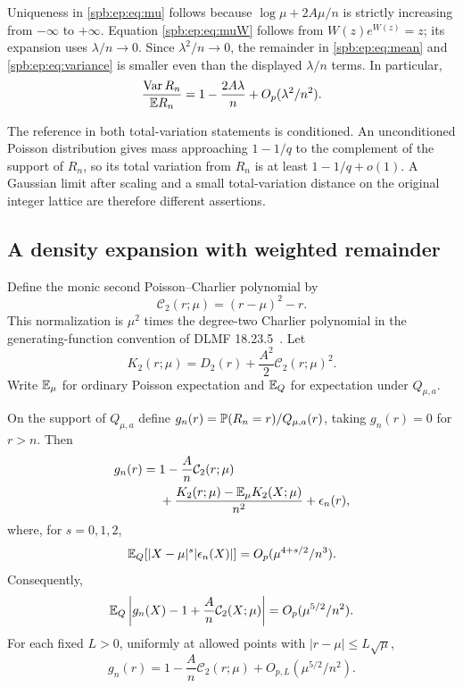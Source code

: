 Uniqueness in \eqref{spb:ep:eq:mu} follows because
$\log\mu+2A\mu/n$ is strictly increasing from $-\infty$ to $+\infty$.
Equation \eqref{spb:ep:eq:muW} follows from $W(z)e^{W(z)}=z$;
its expansion uses $\lambda/n\to0$.
Since $\lambda^2/n\to0$, the remainder in \eqref{spb:ep:eq:mean} and
\eqref{spb:ep:eq:variance} is smaller even than the displayed $\lambda/n$ terms.
In particular,
\begin{equation}\label{spb:ep:eq:fano}
 \frac{\operatorname{Var} R_n}{\mathbb E R_n}
       =1-\frac{2A\lambda}{n}+O_p(\lambda^2/n^2).
\end{equation}

The reference in both total-variation statements is conditioned.
An unconditioned Poisson distribution gives mass approaching $1-1/q$ to
the complement of the support of $R_n$, so its total variation from
$R_n$ is at least $1-1/q+o(1)$. A Gaussian limit after scaling and a
small total-variation distance on the original integer lattice are
therefore different assertions.

\subsection{A density expansion with weighted remainder}
Define the monic second Poisson--Charlier polynomial by
\begin{equation}\label{spb:ep:eq:charlier}
 \mathcal C_2(r;\mu)=(r-\mu)^2-r.
\end{equation}
This normalization is $\mu^2$ times the degree-two Charlier polynomial
in the generating-function convention of DLMF 18.23.5~\cite{dlmf}.
Let
\begin{equation}\label{spb:ep:eq:K2}
 K_2(r;\mu)=D_2(r)+\frac{A^2}{2}\mathcal C_2(r;\mu)^2.
\end{equation}
Write $\mathbb E_\mu$ for ordinary Poisson expectation and $\mathbb E_Q$ for expectation
under $Q_{\mu,a}$.

\begin{theorem}\label{spb:ep:thm:weighted}
On the support of $Q_{\mu,a}$ define
$g_n(r)=\mathbb P(R_n=r)/Q_{\mu,a}(r)$, taking $g_n(r)=0$ for $r>n$.
Then
\begin{align}\label{spb:ep:eq:secondensity}
 g_n(r)={}&1-\frac{A}{n}\mathcal C_2(r;\mu)\nonumber\\
 &+\frac{K_2(r;\mu)-\mathbb E_\mu K_2(X;\mu)}{n^2}
   +\epsilon_n(r),
\end{align}
where, for $s=0,1,2$,
\begin{equation}\label{spb:ep:eq:weightedrem}
 \mathbb E_Q[|X-\mu|^s|\epsilon_n(X)|]
                       =O_p(\mu^{4+s/2}/n^3).
\end{equation}
Consequently,
\begin{equation}\label{spb:ep:eq:firstdensity}
 \mathbb E_Q\left|g_n(X)-1+\frac A n\mathcal C_2(X;\mu)\right|
                          =O_p(\mu^{5/2}/n^2).
\end{equation}
For each fixed $L>0$, uniformly at allowed points with
$|r-\mu|\le L\sqrt\mu$,
\begin{equation}\label{spb:ep:eq:localdensity}
 g_n(r)=1-\frac A n\mathcal C_2(r;\mu)
                         +O_{p,L}(\mu^{5/2}/n^2).
\end{equation}
\end{theorem}

